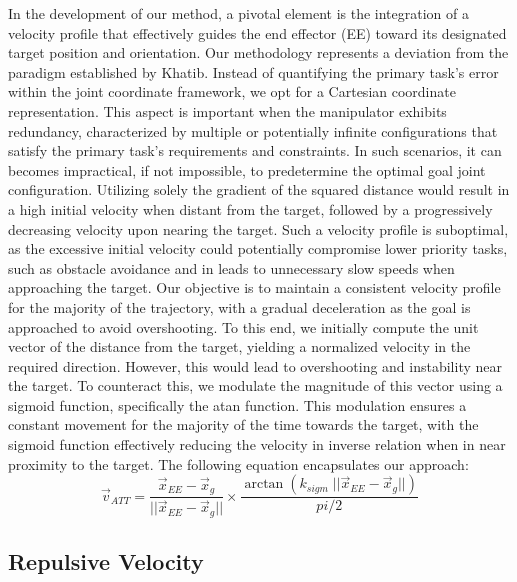 \documentclass[]{article}
\begin{document}
In the development of our method, a pivotal element is the integration of a velocity profile that effectively guides the end effector (EE) toward its designated target position and orientation. Our methodology represents a deviation from the paradigm established by Khatib. Instead of quantifying the primary task's error within the joint coordinate framework, we opt for a Cartesian coordinate representation. This aspect is important when the manipulator exhibits redundancy, characterized by multiple or potentially infinite configurations that satisfy the primary task's requirements and constraints. In such scenarios, it can becomes impractical, if not impossible, to predetermine the optimal goal joint configuration.
Utilizing solely the gradient of the squared distance would result in a high initial velocity when distant from the target, followed by a progressively decreasing velocity upon nearing the target. Such a velocity profile is suboptimal, as the excessive initial velocity could potentially compromise lower priority tasks, such as obstacle avoidance and in leads to unnecessary slow speeds when approaching the target. Our objective is to maintain a consistent velocity profile for the majority of the trajectory, with a gradual deceleration as the goal is approached to avoid overshooting. To this end, we initially compute the unit vector of the distance from the target, yielding a normalized velocity in the required direction. However, this would lead to overshooting and instability near the target. To counteract this, we modulate the magnitude of this vector using a sigmoid function, specifically the atan function. This modulation ensures a constant movement for the majority of the time towards the target, with the sigmoid function effectively reducing the velocity in inverse relation when in near proximity to the target.
The following equation encapsulates our approach:
\begin{equation} 
	\vec{v}_{ATT} = \frac{\vec{x}_{EE} - \vec{x}_g}{||\vec{x}_{EE} - \vec{x}_g||} \times \frac{\arctan(k_{sigm} \; ||\vec{x}_{EE} - \vec{x}_g||) }{pi/2}
\end{equation}







\subsection{Repulsive Velocity}
\end{document}
